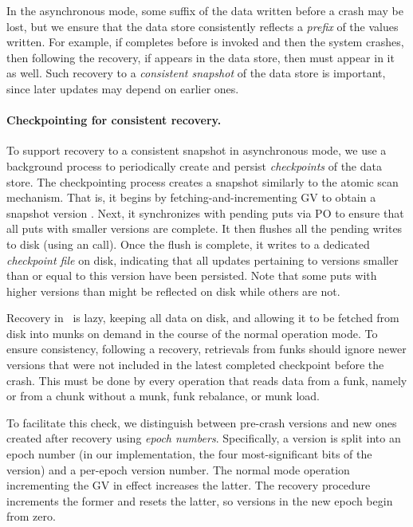 In the asynchronous mode, some suffix of the  data written before a crash may be lost, but we  
ensure that the data store consistently reflects a \emph{prefix} of the  values written.
For example, if  completes before  
is invoked and then the system crashes, then following the recovery, 
if  appears in the data store, then  must appear in it as well. 
Such recovery to a \emph{consistent snapshot} of the data store is important, since later updates may depend on earlier ones. 

\paragraph{Checkpointing for consistent recovery.}

To support recovery to a consistent snapshot in asynchronous mode, we use a background process to
periodically create and persist \emph{checkpoints} of the data store.
The checkpointing process creates a snapshot similarly to the atomic scan mechanism. That is, 
it begins by fetching-and-incrementing GV to obtain a 
 snapshot version .  Next, 
it synchronizes with pending puts via PO to ensure that all puts with smaller versions are complete. 
It then flushes all the pending writes to disk (using an  call). 
Once the flush is complete, it writes  to a dedicated \emph{checkpoint file} on disk,
indicating that all updates pertaining to versions smaller than or equal to this version have been persisted.
Note that some puts with higher versions than  might be reflected on disk while others are not. 

Recovery in \sys\ is lazy, keeping all data on disk, and 
allowing it to be fetched from disk into munks  on demand in the course of the normal operation mode. 
To ensure consistency, following a recovery,  
retrievals from funks should ignore newer versions that were not included in the latest completed checkpoint before the crash. 
This must be done by every operation that reads data from a funk, namely  or  from a chunk without a munk, 
funk rebalance, or munk load. 

To facilitate this check, we distinguish between pre-crash versions and new ones created after recovery using \emph{epoch numbers}. 
Specifically, a version is split into an epoch number (in our implementation, the four most-significant bits of the version) and a per-epoch version number. 
The normal mode operation incrementing the GV in effect increases the latter. The recovery procedure increments the former and resets the latter, so 
versions in the new epoch begin from zero. 

